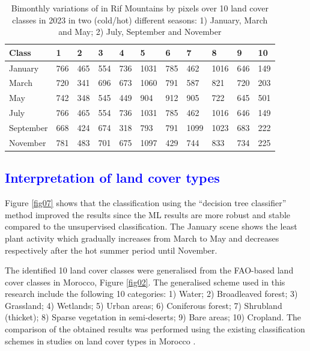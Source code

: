 \documentclass[geomatics,article,submit,pdftex,moreauthors]{Definitions/mdpi}
\begin{document}
\begin{table}[H]
\centering
\begin{tabularx}{\textwidth}{| p{1.5cm} | X | X | X | X | X | X | X | X | X | X | }
  \toprule
   Class & 1 & 2 & 3 & 4 & 5 & 6 & 7 & 8 & 9 & 10 \\
   \midrule
    January & 766 & 465 & 554 & 736 & 1031 & 785 & 462 & 1016 & 646 & 149 \\
    March & 720 & 341 & 696 & 673 & 1060 & 791 & 587 & 821 & 720 & 203 \\
    May & 742 & 348 & 545 & 449 & 904 & 912 & 905 & 722 & 645 & 501 \\
    July & 766 & 465 & 554 & 736 & 1031 & 785 & 462 & 1016 & 646 & 149 \\
    September & 668 & 424 & 674 & 318 & 793 & 791 & 1099 & 1023 & 683 & 222 \\
    November & 781 & 483 & 701 & 675 & 1097 & 429 & 744 & 833 & 734 & 225 \\
    \bottomrule
\end{tabularx}
\caption{Bimonthly variations of in Rif Mountains by pixels over 10 land cover classes in 2023 in two (cold/hot) different seasons: 1) January, March and May; 2) July, September and November}\label{tab01}
\end{table}

\subsection{\textcolor{blue}{Interpretation of land cover types}}

Figure \ref{fig07} shows that the classification using the “decision tree classifier” method improved the results since the ML results are more robust and stable compared to the unsupervised classification. The January scene shows the least plant activity which gradually increases from March to May and decreases respectively after the hot summer period until November.

The identified 10 land cover classes were generalised from the FAO-based land cover classes in Morocco, Figure \ref{fig02}. The generalised scheme used in this research include the following 10 categories: 1) Water; 2) Broadleaved forest; 3) Grassland; 4) Wetlands; 5) Urban areas; 6) Coniferous forest; 7) Shrubland (thicket); 8) Sparse vegetation in semi-deserts; 9) Bare areas; 10) Cropland. The comparison of the obtained results was performed using the existing classification schemes in studies on land cover types in Morocco \cite{Kusi,Hamdani,Kusi2023,Elfallah,Idoumskine}.
\end{document}
